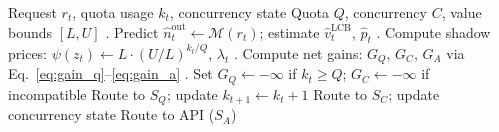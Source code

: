 \begin{algorithm}[tb]
   \caption{Unified Risk-Aware Routing (LA-PD)}
   \label{alg:lapd}
\begin{algorithmic}
    Request $r_t$, quota usage $k_t$, concurrency state
    Quota $Q$, concurrency $C$, value bounds $[L, U]$
   . Predict $\hat{n}_t^{\text{out}} \gets \mathcal{M}(r_t)$; estimate $\hat{v}_t^{\text{LCB}}$, $\hat{p}_t$
   . Compute shadow prices: $\psi(z_t) \gets L \cdot (U/L)^{k_t/Q}$, $\lambda_t$
   . Compute net gains: $G_Q$, $G_C$, $G_A$ via Eq.~\eqref{eq:gain_q}--\eqref{eq:gain_a}
   . Set $G_Q \gets -\infty$ if $k_t \geq Q$; $G_C \gets -\infty$ if incompatible
       \STATE Route to $S_Q$; update $k_{t+1} \gets k_t + 1$
       \STATE Route to $S_C$; update concurrency state
   \ELSE
       \STATE Route to API ($S_A$)
   \ENDIF
\end{algorithmic}
\end{algorithm}
